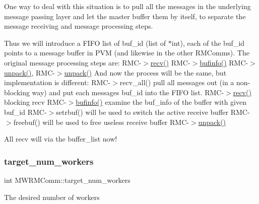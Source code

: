One way to deal with this situation is to pull all the messages in the underlying message passing layer and let the master buffer them by itself, to separate the message receiving and message processing steps.

Thus we will introduce a F\+I\+FO list of buf\+\_\+id (list of $\ast$int), each of the buf\+\_\+id points to a message buffer in P\+VM (and likewise in the other R\+M\+Comms). The original message processing steps are\+: R\+M\+C-\/$>$\hyperlink{classMWRMComm_a9f10630a68baee310e48d0df33fb2dd8}{recv()} R\+M\+C-\/$>$\hyperlink{classMWRMComm_a7670401dc33950de354e41183dd392cd}{bufinfo()} R\+M\+C-\/$>$\hyperlink{classMWRMComm_af5fe22ee99ecbb178dad85b6474fe61f}{unpack()}, R\+M\+C-\/$>$\hyperlink{classMWRMComm_af5fe22ee99ecbb178dad85b6474fe61f}{unpack()} And now the process will be the same, but implementation is different\+: R\+M\+C-\/$>$recv\+\_\+all() pull all messages out (in a non-\/blocking way) and put each message\textquotesingle{}s buf\+\_\+id into the F\+I\+FO list. R\+M\+C-\/$>$\hyperlink{classMWRMComm_a9f10630a68baee310e48d0df33fb2dd8}{recv()} blocking recv R\+M\+C-\/$>$\hyperlink{classMWRMComm_a7670401dc33950de354e41183dd392cd}{bufinfo()} examine the buf\+\_\+info of the buffer with given buf\+\_\+id R\+M\+C-\/$>$setrbuf() will be used to switch the active receive buffer R\+M\+C-\/$>$freebuf() will be used to free useless receive buffer R\+M\+C-\/$>$\hyperlink{classMWRMComm_af5fe22ee99ecbb178dad85b6474fe61f}{unpack()}

All recv will via the buffer\+\_\+list now! \mbox{\label{classMWRMComm_ada92e3d26d11d240b121b7452a5ac7f9}} 
\subsubsection{\texorpdfstring{target\+\_\+num\+\_\+workers}{target\_num\_workers}}
{\footnotesize\ttfamily int M\+W\+R\+M\+Comm\+::target\+\_\+num\+\_\+workers\hspace{0.3cm}{\ttfamily [protected]}}

The desired number of workers \mbox{\label{classMWRMComm_af444e4e9104d9a9b7ee35e3e4d025bb6}} 
